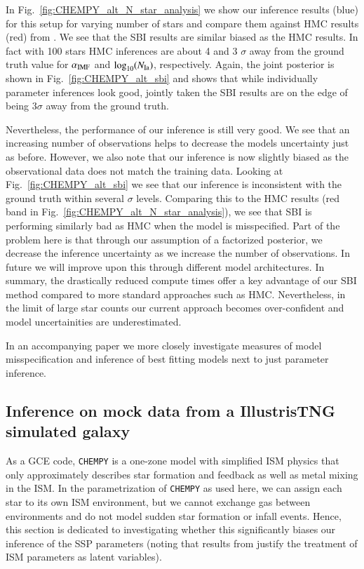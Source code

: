 \documentclass{aa}
\begin{document}
In Fig.~\ref{fig:CHEMPY_alt_N_star_analysis} we show our inference results (blue) for this setup for varying number of stars and compare them against HMC results (red) from \citet{Philcox_2019}. We see that the SBI results are similar biased as the HMC results. In fact with 100 stars HMC inferences are about 4 and 3 $\sigma$ away from the ground truth value for $\alpha_{\rm IMF}$ and $\log_{10}(N_{\rm Ia})$, respectively. Again, the joint posterior is shown in Fig.~\ref{fig:CHEMPY_alt_sbi} and shows that while individually parameter inferences look good, jointly taken the SBI results are on the edge of being $3\sigma$ away from the ground truth.

Nevertheless, the performance of our inference is still very good. We see that an increasing number of observations helps to decrease the models uncertainty just as before. However, we also note that our inference is now slightly biased as the observational data does not match the training data. Looking at Fig.~\ref{fig:CHEMPY_alt_sbi} we see that our inference is inconsistent with the ground truth within several $\sigma$ levels. Comparing this to the HMC results (red band in Fig.~\ref{fig:CHEMPY_alt_N_star_analysis}), we see that SBI is performing similarly bad as HMC when the model is misspecified. Part of the problem here is that through our assumption of a factorized posterior, we decrease the inference uncertainty as we increase the number of observations. In future we will improve upon this through different model architectures. In summary, the drastically reduced compute times offer a key advantage of our SBI method compared to more standard approaches such as HMC. Nevertheless, in the limit of large star counts our current approach becomes over-confident and model uncertainities are underestimated.

In an accompanying paper we more closely investigate measures of model misspecification and inference of best fitting models next to just parameter inference.  

\subsection{Inference on mock data from a IllustrisTNG simulated galaxy}
\label{subsec:tng_sim}

As a GCE code, \texttt{CHEMPY} is a one-zone model with simplified ISM physics that only approximately describes star formation and feedback as well as metal mixing in the ISM.
In the parametrization of \texttt{CHEMPY} as used here, we can assign each star to its own ISM environment, but we cannot exchange gas between environments and do not model sudden star formation or infall events. Hence, this section is dedicated to investigating whether this significantly biases our inference of the SSP parameters (noting that results from \citet{2019ApJ...874..102W} justify the treatment of ISM parameters as latent variables).
\end{document}
